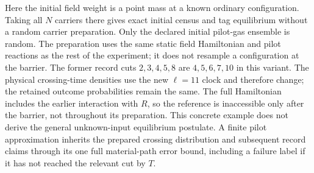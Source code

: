\documentclass[11pt]{article}
\theoremstyle{definition}\newtheorem{definition}[theorem]{Definition}
\theoremstyle{remark}\newtheorem{remark}[theorem]{Remark}
\begin{document}
Here the initial field weight is a point mass at a known ordinary
configuration.  Taking all $N$ carriers there gives exact initial
census and tag equilibrium without a random carrier preparation.
Only the declared initial pilot-gas ensemble is random.  The preparation
uses the same static field Hamiltonian and pilot reactions as the rest
of the experiment; it does not resample a configuration at the barrier.
The former record cuts $2,3,4,5,8$ are $4,5,6,7,10$ in this variant.
The physical crossing-time densities use the new $\ell=11$ clock and
therefore change; the retained outcome probabilities remain the same.
The full Hamiltonian includes the earlier interaction with $R$, so the
reference is inaccessible only after the barrier, not throughout its
preparation.  This concrete example does not derive the general
unknown-input equilibrium postulate.  A finite pilot approximation
inherits the prepared crossing distribution and subsequent record
claims through its one full material-path error bound, including a
failure label if it has not reached the relevant cut by $T$.
\end{document}
